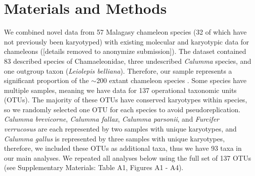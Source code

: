 \documentclass[a4paper, 12pt]{article}
\begin{document}
\section{Materials and Methods}

We combined novel data from 57 Malagasy chameleon species (32 of which have not previously been karyotyped) with existing molecular and karyotypic data for chameleons ([details removed to anonymize submission]). 
The dataset contained 83 described species of Chamaeleonidae, three undescribed \textit{Calumma} species, and one outgroup taxon (\textit{Leiolepis belliana}). 
Therefore, our sample represents a significant proportion of the $\sim$200 extant chameleon species \citep{uetz2022}. 
Some species have multiple samples, meaning we have data for 137 operational taxonomic units (OTUs). 
The majority of these OTUs have conserved karyotypes within species, so we randomly selected one OTU for each species to avoid pseudoreplication.
\textit{Calumma brevicorne}, \textit{Calumma fallax}, \textit{Calumma parsonii}, and \textit{Furcifer verrucosus} are each represented by two samples with unique karyotypes, and \textit{Calumma gallus} is represented by three samples with unique karyotypes, therefore, we included these OTUs as additional taxa, thus we have 93 taxa in our main analyses. 
We repeated all analyses below using the full set of 137 OTUs (see Supplementary Materials: Table A1, Figures A1 - A4).
\end{document}
